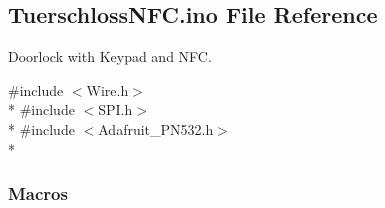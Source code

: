 \hypertarget{TuerschlossNFC_8ino}{}\subsection{Tuerschloss\+N\+F\+C.\+ino File Reference}
\label{TuerschlossNFC_8ino}


Doorlock with Keypad and N\+FC.  


{\ttfamily \#include $<$Wire.\+h$>$}\\*
{\ttfamily \#include $<$S\+P\+I.\+h$>$}\\*
{\ttfamily \#include $<$Adafruit\+\_\+\+P\+N532.\+h$>$}\\*
\subsubsection*{Macros}
